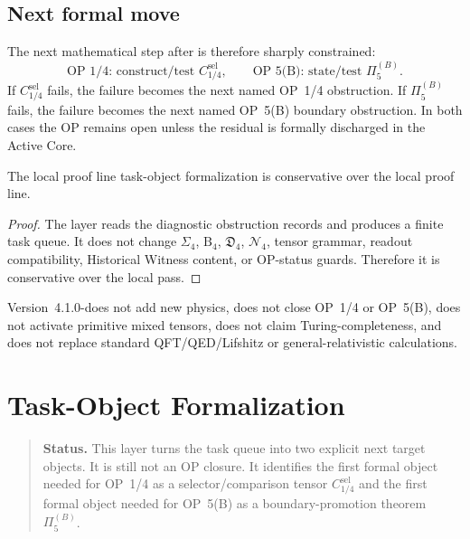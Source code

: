 \subsection{Next formal move}
\label{subsec:v410r03-next-formal-move}

The next mathematical step after is therefore sharply constrained:
\[
 \text{OP~1/4: construct/test } C_{1/4}^{\mathrm{sel}},
 \qquad
 \text{OP~5(B): state/test } \Pi_{5}^{(B)}.
\]
If \(C_{1/4}^{\mathrm{sel}}\) fails, the failure becomes the next named OP~1/4
obstruction. If \(\Pi_{5}^{(B)}\) fails, the failure becomes the next named OP~5(B)
boundary obstruction. In both cases the OP remains open unless the residual is
formally discharged in the Active Core.

\begin{theorem}
\label{thm:v410r03-obstruction-to-task-reduction-conservativity}
The local proof line task-object formalization is conservative over the local proof line.
\end{theorem}

\begin{proof}
The layer reads the diagnostic obstruction records and produces a
finite task queue. It does not change \(\Sigma_4\), \(\mathrm B_4\),
\(\mathfrak D_4\), \(\mathcal N_4\), tensor grammar, readout compatibility,
Historical Witness content, or OP-status guards. Therefore it is conservative
over the local pass.
\end{proof}

\begin{remark}
\label{rem:v410r03-non-claim}
Version~4.1.0-does not add new physics, does not close OP~1/4 or OP~5(B),
does not activate primitive mixed tensors, does not claim Turing-completeness,
and does not replace standard QFT/QED/Lifshitz or general-relativistic
calculations.
\end{remark}



\clearpage
\section{Task-Object Formalization}
\label{sec:v410r04-task-object-formalization}

\begin{quote}\small
\noindent\textbf{Status.}
This layer turns the task queue into two explicit next target objects. It
is still not an OP closure. It identifies the first formal object needed for
OP~1/4 as a selector/comparison tensor $C_{1/4}^{\mathrm{sel}}$ and the first formal object
needed for OP~5(B) as a boundary-promotion theorem $\Pi_{5}^{(B)}$.
\end{quote}

